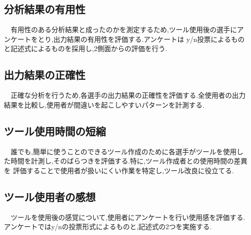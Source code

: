 \documentclass[../main.tex]{subfiles}
\begin{document}
\subsection{分析結果の有用性}
\par　有用性のある分析結果と成ったのかを測定するため,ツール使用後の選手にアンケートをとり,出力結果の有用性を評価する.アンケートは
y/n投票によるものと記述式によるものを採用し,2側面からの評価を行う.

\subsection{出力結果の正確性}
\par　正確な分析を行うため,各選手の出力結果の正確性を評価する.全使用者の出力結果を比較し,使用者が間違いを起こしやすいパターンを計測する.

\subsection{ツール使用時間の短縮}
\par　誰でも,簡単に使うことのできるツール作成のために各選手がツールを使用した時間を計測し,そのばらつきを評価する.特に,ツール作成者との使用時間の差異を
評価することで使用者が扱いにくい作業を特定し,ツール改良に役立てる.

\subsection{ツール使用者の感想}
\par　ツールを使用後の感覚について,使用者にアンケートを行い使用感を評価する.アンケートではy/nの投票形式によるものと,記述式の2つを実施する.
\end{document}
